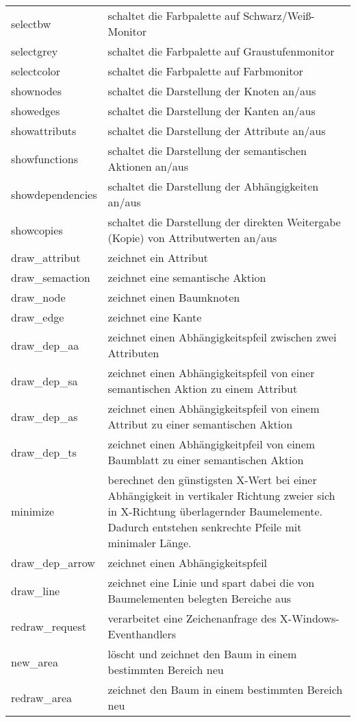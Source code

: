 \bigskip
\begin{tabular}{|l|p{9.0cm}|}
\hline
selectbw        & schaltet die Farbpalette auf Schwarz/Wei\ss{}-Monitor \\
selectgrey      & schaltet die Farbpalette auf Graustufenmonitor \\
selectcolor     & schaltet die Farbpalette auf Farbmonitor \\
shownodes       & schaltet die Darstellung der Knoten an/aus \\
showedges       & schaltet die Darstellung der Kanten an/aus \\
showattributs   & schaltet die Darstellung der Attribute an/aus \\
showfunctions   & schaltet die Darstellung der semantischen Aktionen an/aus \\
showdependencies & schaltet die Darstellung der Abh\"angigkeiten an/aus \\
showcopies      & schaltet die Darstellung der direkten Weitergabe (Kopie) von Attributwerten an/aus \\
draw\_attribut  & zeichnet ein Attribut \\
draw\_semaction & zeichnet eine semantische Aktion \\
draw\_node      & zeichnet einen Baumknoten \\
draw\_edge      & zeichnet eine Kante \\
draw\_dep\_aa   & zeichnet einen Abh\"angigkeitspfeil zwischen zwei Attributen \\
draw\_dep\_sa   & zeichnet einen Abh\"angigkeitspfeil von einer semantischen Aktion zu einem Attribut \\
draw\_dep\_as   & zeichnet einen Abh\"angigkeitspfeil von einem Attribut zu einer semantischen Aktion \\
draw\_dep\_ts   & zeichnet einen Abh\"angigkeitpfeil von einem Baumblatt zu einer semantischen Aktion \\
minimize        & berechnet den g\"unstigsten X-Wert bei einer Abh\"angigkeit in  vertikaler Richtung zweier sich in X-Richtung \"uberlagernder
Baumelemente. Dadurch entstehen senkrechte Pfeile mit minimaler L\"ange. \\
draw\_dep\_arrow & zeichnet einen Abh\"angigkeitspfeil\\
draw\_line      & zeichnet eine Linie und spart dabei die von Baumelementen belegten Bereiche aus \\
redraw\_request & verarbeitet eine Zeichenanfrage des X-Windows-Eventhandlers \\
new\_area       & l\"oscht und zeichnet den Baum in einem bestimmten Bereich neu \\ redraw\_area & zeichnet den Baum in einem
bestimmten Bereich neu \\
\hline
\end{tabular}
\bigskip

